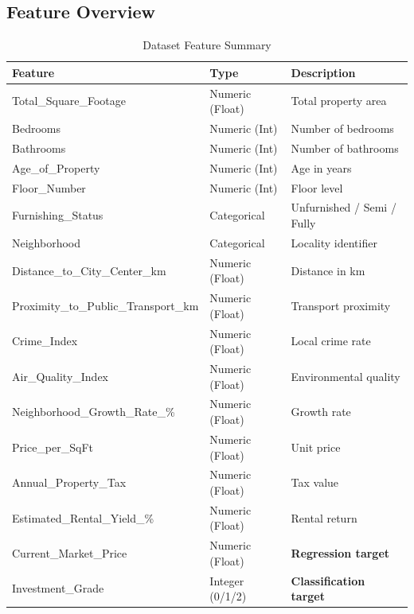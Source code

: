 \documentclass[12pt,a4paper]{article}
\begin{document}
\subsection{Feature Overview}

\begin{table}[H]
\centering
\caption{Dataset Feature Summary}
\begin{tabular}{@{} l l l @{}}
\toprule
\textbf{Feature} & \textbf{Type} & \textbf{Description} \\
\midrule
Total\_Square\_Footage           & Numeric (Float) & Total property area \\
Bedrooms                         & Numeric (Int)   & Number of bedrooms \\
Bathrooms                        & Numeric (Int)   & Number of bathrooms \\
Age\_of\_Property                & Numeric (Int)   & Age in years \\
Floor\_Number                    & Numeric (Int)   & Floor level \\
Furnishing\_Status               & Categorical     & Unfurnished / Semi / Fully \\
Neighborhood                     & Categorical     & Locality identifier \\
Distance\_to\_City\_Center\_km   & Numeric (Float) & Distance in km \\
Proximity\_to\_Public\_Transport\_km & Numeric (Float) & Transport proximity \\
Crime\_Index                     & Numeric (Float) & Local crime rate \\
Air\_Quality\_Index              & Numeric (Float) & Environmental quality \\
Neighborhood\_Growth\_Rate\_\%  & Numeric (Float) & Growth rate \\
Price\_per\_SqFt                 & Numeric (Float) & Unit price \\
Annual\_Property\_Tax            & Numeric (Float) & Tax value \\
Estimated\_Rental\_Yield\_\%    & Numeric (Float) & Rental return \\
Current\_Market\_Price           & Numeric (Float) & \textbf{Regression target} \\
Investment\_Grade                & Integer (0/1/2) & \textbf{Classification target} \\
\bottomrule
\end{tabular}
\end{table}
\end{document}

